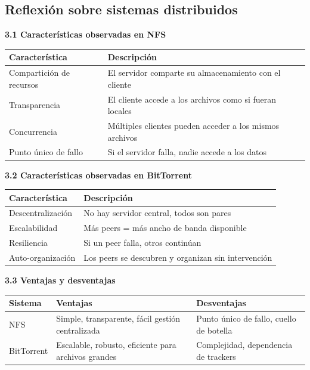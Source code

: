 \documentclass[12pt,a4paper]{report}
\begin{document}
\subsection{Reflexión sobre sistemas distribuidos}

\textbf{3.1 Características observadas en NFS}

\begin{table}[h]
\centering
\begin{tabular}{|p{4cm}|p{10cm}|}
\hline
\textbf{Característica} & \textbf{Descripción} \\ \hline
Compartición de recursos & El servidor comparte su almacenamiento con el cliente \\ \hline
Transparencia & El cliente accede a los archivos como si fueran locales \\ \hline
Concurrencia & Múltiples clientes pueden acceder a los mismos archivos \\ \hline
Punto único de fallo & Si el servidor falla, nadie accede a los datos \\ \hline
\end{tabular}
\end{table}

\textbf{3.2 Características observadas en BitTorrent}

\begin{table}[h]
\centering
\begin{tabular}{|p{4cm}|p{10cm}|}
\hline
\textbf{Característica} & \textbf{Descripción} \\ \hline
Descentralización & No hay servidor central, todos son pares \\ \hline
Escalabilidad & Más peers = más ancho de banda disponible \\ \hline
Resiliencia & Si un peer falla, otros continúan \\ \hline
Auto-organización & Los peers se descubren y organizan sin intervención \\ \hline
\end{tabular}
\end{table}

\textbf{3.3 Ventajas y desventajas}

\begin{table}[h]
\centering
\begin{tabular}{|p{3cm}|p{5cm}|p{6cm}|}
\hline
\textbf{Sistema} & \textbf{Ventajas} & \textbf{Desventajas} \\ \hline
NFS & Simple, transparente, fácil gestión centralizada & Punto único de fallo, cuello de botella \\ \hline
BitTorrent & Escalable, robusto, eficiente para archivos grandes & Complejidad, dependencia de trackers \\ \hline
\end{tabular}
\end{table}
\end{document}
